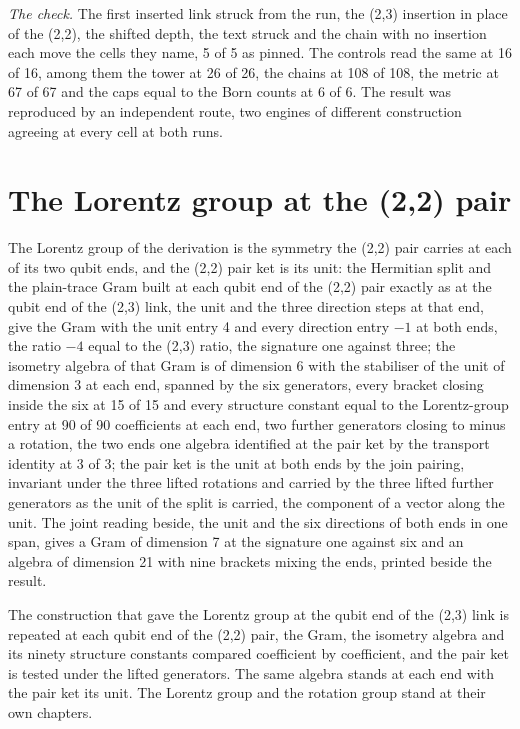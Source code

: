 \begin{chproof}
\textit{The check.} The first inserted link struck from the run, the (2,3) insertion in place of the (2,2), the shifted depth, the text struck and the chain with no insertion each move the cells they name, 5 of 5 as pinned. The controls read the same at 16 of 16, among them the tower at 26 of 26, the chains at 108 of 108, the metric at 67 of 67 and the caps equal to the Born counts at 6 of 6. The result was reproduced by an independent route, two engines of different construction agreeing at every cell at both runs.
\end{chproof}

\section{The Lorentz group at the (2,2) pair}\label{mod:X-0-D542186-lzpp-t1}
\begin{chtheorem}
The Lorentz group of the derivation is the symmetry the (2,2) pair carries at each of its two qubit ends, and the (2,2) pair ket is its unit: the Hermitian split and the plain-trace Gram built at each qubit end of the (2,2) pair exactly as at the qubit end of the (2,3) link, the unit and the three direction steps at that end, give the Gram with the unit entry 4 and every direction entry $-1$ at both ends, the ratio $-4$ equal to the (2,3) ratio, the signature one against three; the isometry algebra of that Gram is of dimension 6 with the stabiliser of the unit of dimension 3 at each end, spanned by the six generators, every bracket closing inside the six at 15 of 15 and every structure constant equal to the Lorentz-group entry at 90 of 90 coefficients at each end, two further generators closing to minus a rotation, the two ends one algebra identified at the pair ket by the transport identity at 3 of 3; the pair ket is the unit at both ends by the join pairing, invariant under the three lifted rotations and carried by the three lifted further generators as the unit of the split is carried, the component of a vector along the unit. The joint reading beside, the unit and the six directions of both ends in one span, gives a Gram of dimension 7 at the signature one against six and an algebra of dimension 21 with nine brackets mixing the ends, printed beside the result.
\end{chtheorem}
\chdeps{}{}
The construction that gave the Lorentz group at the qubit end of the (2,3) link is repeated at each qubit end of the (2,2) pair, the Gram, the isometry algebra and its ninety structure constants compared coefficient by coefficient, and the pair ket is tested under the lifted generators. The same algebra stands at each end with the pair ket its unit. The Lorentz group and the rotation group stand at their own chapters.
